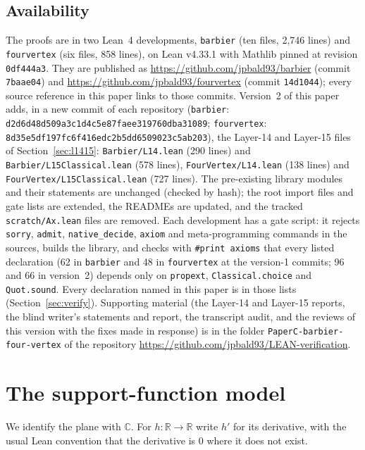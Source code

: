 \documentclass[11pt]{article}
\theoremstyle{definition}
\theoremstyle{remark}
\newcommand{\lean}[1]{\texttt{#1}}
\newcommand{\RR}{\mathbb{R}}
\newcommand{\CC}{\mathbb{C}}
\begin{document}
\subsection{Availability}\label{sec:avail}
The proofs are in two Lean~4 developments, \lean{barbier} (ten files, 2{,}746 lines) and
\lean{fourvertex} (six files, 858 lines), on Lean v4.33.1 \cite{lean4} with Mathlib \cite{mathlib2020} pinned at revision
\texttt{0df444a3}. They are published as \url{https://github.com/jpbald93/barbier} (commit
\texttt{7baae04}) and \url{https://github.com/jpbald93/fourvertex} (commit \texttt{14d1044}); every
source reference in this paper links to those commits. Version~2 of this paper adds, in a new
commit of each repository (\lean{barbier}: \texttt{d2d6d48d509a3c1d4c5e87faee319760dba31089}; \lean{fourvertex}: \texttt{8d35e5df197fc6f416edc2b5dd6509023c5ab203}),
the Layer-14 and Layer-15 files of Section~\ref{sec:l1415}: \lean{Barbier/L14.lean} (290 lines) and
\lean{Barbier/L15Classical.lean} (578 lines), \lean{FourVertex/L14.lean} (138 lines) and
\lean{FourVertex/L15Classical.lean} (727 lines). The pre-existing library modules and their
statements are unchanged (checked by hash); the root import files and gate lists are extended, the
READMEs are updated, and the tracked \lean{scratch/Ax.lean} files are removed. Each development has a gate script: it rejects \lean{sorry}, \lean{admit},
\lean{native\_decide}, \lean{axiom} and meta-programming commands in the sources, builds the library,
and checks with \lean{\#print axioms} that every listed declaration (62 in \lean{barbier} and 48 in
\lean{fourvertex} at the version-1 commits; 96 and 66 in version~2) depends only on \lean{propext}, \lean{Classical.choice} and \lean{Quot.sound}.
Every declaration named in this paper is in those lists (Section~\ref{sec:verify}).
Supporting material (the Layer-14 and Layer-15 reports, the blind writer's statements and report, the transcript audit, and the reviews of this version with the fixes made in response) is in the folder \texttt{PaperC-barbier-four-vertex} of the repository \url{https://github.com/jpbald93/LEAN-verification}.

\section{The support-function model}\label{sec:model}

We identify the plane with $\CC$. For $h:\RR\to\RR$ write $h'$ for its derivative, with the usual
Lean convention that the derivative is $0$ where it does not exist.
\end{document}
